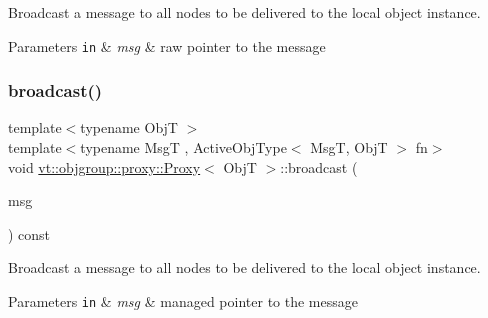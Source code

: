 Broadcast a message to all nodes to be delivered to the local object instance. 


\begin{DoxyParams}[1]{Parameters}
\mbox{\tt in}  & {\em msg} & raw pointer to the message \\
\hline
\end{DoxyParams}
\mbox{\label{structvt_1_1objgroup_1_1proxy_1_1_proxy_a7616a82936034b59e1b05c6b033236a2}} 
\subsubsection{\texorpdfstring{broadcast()}{broadcast()}\hspace{0.1cm}{\footnotesize\ttfamily [2/3]}}
{\footnotesize\ttfamily template$<$typename ObjT $>$ \\
template$<$typename MsgT , Active\+Obj\+Type$<$ Msg\+T, Obj\+T $>$ fn$>$ \\
void \hyperlink{structvt_1_1objgroup_1_1proxy_1_1_proxy}{vt\+::objgroup\+::proxy\+::\+Proxy}$<$ ObjT $>$\+::broadcast (\begin{DoxyParamCaption}\item[{\hyperlink{namespacevt_a9f5ebd62ee9d6dd8829e3e1cc4f858e9}{Msg\+Ptr}$<$ MsgT $>$}]{msg }\end{DoxyParamCaption}) const}



Broadcast a message to all nodes to be delivered to the local object instance. 


\begin{DoxyParams}[1]{Parameters}
\mbox{\tt in}  & {\em msg} & managed pointer to the message \\
\hline
\end{DoxyParams}
\mbox{\label{structvt_1_1objgroup_1_1proxy_1_1_proxy_ad4f1ddeb5b09f01643b17a93bbbe82e9}} 
